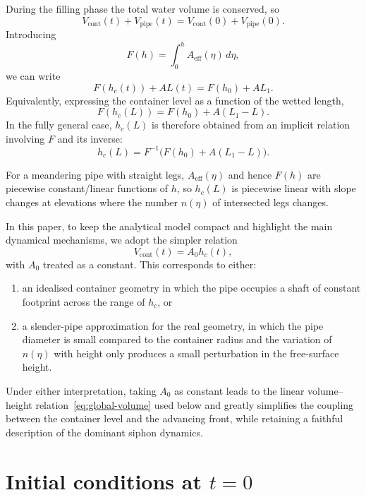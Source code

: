 \documentclass[11pt]{article}
\begin{document}
During the filling phase the total water volume is conserved, so
\[
  V_{\text{cont}}(t) + V_{\text{pipe}}(t)
  = V_{\text{cont}}(0) + V_{\text{pipe}}(0).
\]
Introducing
\[
  F(h) = \int_0^{h} A_{\text{eff}}(\eta)\,d\eta,
\]
we can write
\[
  F(h_c(t)) + A L(t) = F(h_0) + A L_1.
\]
Equivalently, expressing the container level as a function of the wetted length,
\[
  F(h_c(L)) = F(h_0) + A (L_1 - L).
\]
In the fully general case, $h_c(L)$ is therefore obtained from an implicit relation involving
$F$ and its inverse:
\[
  h_c(L) = F^{-1}\Big(F(h_0) + A (L_1 - L)\Big).
\]

For a meandering pipe with straight legs, $A_{\text{eff}}(\eta)$ and hence $F(h)$ are piecewise
constant/linear functions of $h$, so $h_c(L)$ is piecewise linear with slope changes at
elevations where the number $n(\eta)$ of intersected legs changes.

In this paper, to keep the analytical model compact and highlight the main dynamical
mechanisms, we adopt the simpler relation
\[
  V_{\text{cont}}(t) = A_0 h_c(t),
\]
with $A_0$ treated as a constant. This corresponds to either:
\begin{enumerate}
  \item an idealised container geometry in which the pipe occupies a shaft of constant footprint
        across the range of $h_c$, or
  \item a slender-pipe approximation for the real geometry, in which the pipe diameter is small
        compared to the container radius and the variation of $n(\eta)$ with height only
        produces a small perturbation in the free-surface height.
\end{enumerate}
Under either interpretation, taking $A_0$ as constant leads to the linear volume--height
relation~\eqref{eq:global-volume} used below and greatly simplifies the coupling between the container level and the
advancing front, while retaining a faithful description of the dominant siphon dynamics.

\section{Initial conditions at \texorpdfstring{$t=0$}{t=0}}
\end{document}
